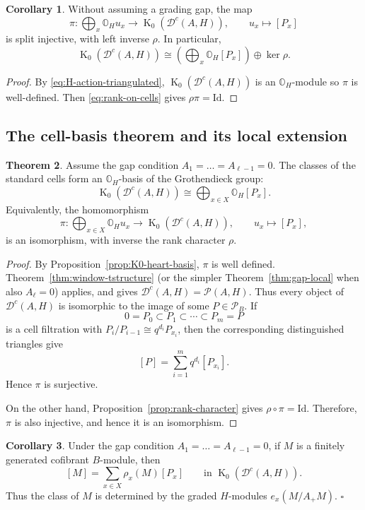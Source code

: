 \documentclass[11pt]{article}
\theoremstyle{definition}
\newtheorem{thm}{Theorem}[section]
\newtheorem{cor}[thm]{Corollary}
\numberwithin{equation}{section}
\def\Id{\mathrm{Id}}
\newcommand{\Pun}{\mathcal{P}_B}
\newcommand{\Tcat}{\mathcal{P}(A,H)}
\newcommand{\Dc}{\mathcal{D}^c(A,H)}
\newcommand{\K}{\operatorname{K}_0}
\newcommand{\OH}{\mathbb{O}_H}
\begin{document}
\begin{cor}
\label{cor:K0-split-lattice}
Without assuming a grading gap, the map
\[
 \pi:\bigoplus_x\OH u_x \longrightarrow\K(\Dc),\qquad
 u_x\longmapsto[P_x]
\]
is split injective, with left inverse $\rho$.  In particular,
\[
 \K(\Dc)\cong\left(\bigoplus_x\OH[P_x]\right)\oplus\ker\rho.
\]
\end{cor}
\begin{proof}
By \eqref{eq:H-action-triangulated}, $\K(\Dc)$ is an $\OH$-module so $\pi$ is well-defined. Then
\eqref{eq:rank-on-cells} gives $\rho\pi=\Id$.
\end{proof}

\subsection{The cell-basis theorem and its local extension}
\label{sec:K0-gap}
\begin{thm}\label{thm:K0}
Assume the gap condition 
$A_1=\dots = A_{\ell-1}=0$.
The classes of the standard cells form an
$\OH$-basis of the Grothendieck group:
\[
\K(\Dc)
\cong
\bigoplus_{x\in X}\OH[P_x].
\]
Equivalently, the homomorphism
\[
\pi:\bigoplus_{x\in X}\OH u_x\longrightarrow \K(\Dc),
\qquad
u_x\longmapsto[P_x],
\]
is an isomorphism, with inverse the rank character $\rho$.
\end{thm}

\begin{proof}
By Proposition~\ref{prop:K0-heart-basis}, $\pi$ is well defined.
Theorem~\ref{thm:window-tstructure} (or the simpler Theorem~\ref{thm:gap-local} when also $A_\ell=0$) applies, and gives $\Dc=\Tcat$.  Thus every object of $\Dc$ is isomorphic to the image of
some $P\in\Pun$.  If
\[
0=P_0\subset P_1\subset\cdots\subset P_m=P
\]
is a cell filtration with
$P_i/P_{i-1}\cong q^{d_i}P_{x_i}$,
then the corresponding distinguished triangles give
\[
[P]=\sum_{i=1}^m q^{d_i}[P_{x_i}].
\]
Hence $\pi$ is surjective.

On the other hand, Proposition~\ref{prop:rank-character} gives
$\rho\circ\pi=\Id$.
Therefore, $\pi$ is also injective, and hence it is an isomorphism.
\end{proof}



\begin{cor}\label{cor:K0-coordinate}
Under the gap condition 
$A_1=\dots = A_{\ell-1}=0$, if $M$ is
a finitely generated cofibrant $B$-module, then
\[
[M]
=
\sum_{x\in X}
\rho_x(M)[P_x]
\qquad\text{in }\K(\Dc).
\]
Thus the class of $M$ is determined by the graded $H$-modules
$e_x(M/A_+M)$. \hfill $\square$
\end{cor}
\end{document}
